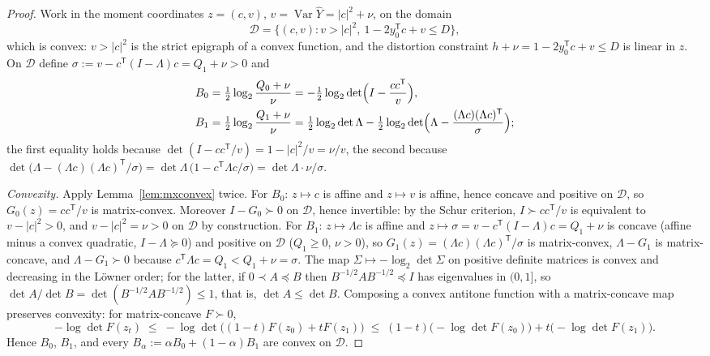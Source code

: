 \documentclass[11pt,onecolumn]{IEEEtran}
\newcommand{\hY}{\widehat{Y}}
\begin{document}
\begin{proof}
Work in the moment coordinates $z=(c,v)$,
$v=\operatorname{Var}\hY=|c|^2+\nu$, on the domain
\[
\mathcal D=\bigl\{(c,v):v>|c|^2,\ 1-2y_0^{\mathsf T}c+v\le D\bigr\},
\]
which is convex: $v>|c|^2$ is the strict epigraph of a convex
function, and the distortion constraint
$h+\nu=1-2y_0^{\mathsf T}c+v\le D$ is linear in $z$. On $\mathcal D$
define $\sigma:=v-c^{\mathsf T}(I-\Lambda)c=Q_1+\nu>0$ and
\begin{align*}
B_0&=\tfrac12\log_2\frac{Q_0+\nu}{\nu}
=-\tfrac12\log_2\det\Bigl(I-\frac{cc^{\mathsf T}}{v}\Bigr),\\
B_1&=\tfrac12\log_2\frac{Q_1+\nu}{\nu}
=\tfrac12\log_2\det\Lambda
-\tfrac12\log_2\det\Bigl(\Lambda
-\frac{(\Lambda c)(\Lambda c)^{\mathsf T}}{\sigma}\Bigr);
\end{align*}
the first equality holds because
$\det(I-cc^{\mathsf T}/v)=1-|c|^2/v=\nu/v$, the second because
$\det\bigl(\Lambda-(\Lambda c)(\Lambda c)^{\mathsf T}/\sigma\bigr)
=\det\Lambda\,\bigl(1-c^{\mathsf T}\Lambda c/\sigma\bigr)
=\det\Lambda\cdot \nu/\sigma$.

\emph{Convexity.} Apply Lemma~\ref{lem:mxconvex} twice. For $B_0$:
$z\mapsto c$ is affine and $z\mapsto v$ is affine, hence concave and
positive on $\mathcal D$, so $G_0(z)=cc^{\mathsf T}/v$ is
matrix-convex. Moreover $I-G_0\succ0$ on $\mathcal D$, hence
invertible: by the Schur criterion, $I\succ cc^{\mathsf T}/v$ is
equivalent to $v-|c|^2>0$, and $v-|c|^2=\nu>0$ on $\mathcal D$ by
construction. For $B_1$: $z\mapsto\Lambda c$ is affine and
$z\mapsto\sigma=v-c^{\mathsf T}(I-\Lambda)c=Q_1+\nu$ is concave (affine
minus a convex quadratic, $I-\Lambda\succeq0$) and positive on
$\mathcal D$ ($Q_1\ge0$, $\nu>0$), so
$G_1(z)=(\Lambda c)(\Lambda c)^{\mathsf T}/\sigma$ is matrix-convex,
$\Lambda-G_1$ is matrix-concave, and $\Lambda-G_1\succ0$ because
$c^{\mathsf T}\Lambda c=Q_1<Q_1+\nu=\sigma$. The map
$\Sigma\mapsto-\log_2\det\Sigma$ on positive definite matrices is
convex and decreasing in the L\"owner order; for the latter, if
$0\prec A\preceq B$ then $B^{-1/2}AB^{-1/2}\preceq I$ has eigenvalues
in $(0,1]$, so $\det A/\det B=\det(B^{-1/2}AB^{-1/2})\le1$, that is,
$\det A\le\det B$. Composing a convex
antitone function with a matrix-concave map preserves convexity: for
matrix-concave $F\succ0$,
\[
-\log\det F(z_t)
\;\le\;-\log\det\bigl((1-t)F(z_0)+tF(z_1)\bigr)
\;\le\;(1-t)\bigl(-\log\det F(z_0)\bigr)
+t\bigl(-\log\det F(z_1)\bigr).
\]
Hence $B_0$, $B_1$, and every
$B_\alpha:=\alpha B_0+(1-\alpha)B_1$ are convex on $\mathcal D$.


\end{proof}
\end{document}
